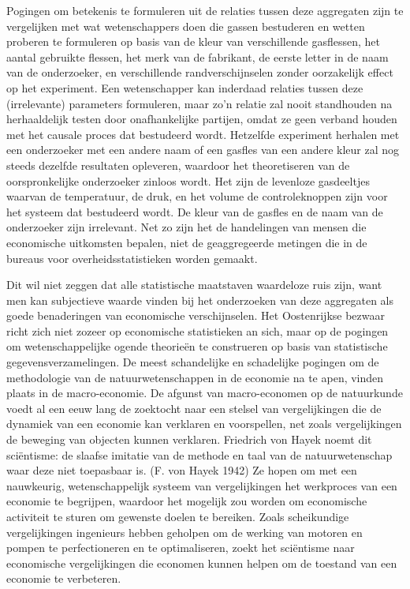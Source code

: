 \documentclass[
  a5paper,
  smalldemyvopaper,11pt,twoside,onecolumn,openright,extrafontsizes,
hidelinks]{memoir}
\begin{document}
Pogingen om betekenis te formuleren uit de relaties tussen deze
aggregaten zijn te vergelijken met wat wetenschappers doen die gassen
bestuderen en wetten proberen te formuleren op basis van de kleur van
verschillende gasflessen, het aantal gebruikte flessen, het merk van de
fabrikant, de eerste letter in de naam van de onderzoeker, en
verschillende randverschijnselen zonder oorzakelijk effect op het
experiment. Een wetenschapper kan inderdaad relaties tussen deze
(irrelevante) parameters formuleren, maar zo'n relatie zal nooit
standhouden na herhaaldelijk testen door onafhankelijke partijen, omdat
ze geen verband houden met het causale proces dat bestudeerd wordt.
Hetzelfde experiment herhalen met een onderzoeker met een andere naam of
een gasfles van een andere kleur zal nog steeds dezelfde resultaten
opleveren, waardoor het theoretiseren van de oorspronkelijke onderzoeker
zinloos wordt. Het zijn de levenloze gasdeeltjes waarvan de temperatuur,
de druk, en het volume de controleknoppen zijn voor het systeem dat
bestudeerd wordt. De kleur van de gasfles en de naam van de onderzoeker
zijn irrelevant. Net zo zijn het de handelingen van mensen die
economische uitkomsten bepalen, niet de geaggregeerde metingen die in de
bureaus voor overheidsstatistieken worden gemaakt.

Dit wil niet zeggen dat alle statistische maatstaven waardeloze ruis
zijn, want men kan subjectieve waarde vinden bij het onderzoeken van
deze aggregaten als goede benaderingen van economische verschijnselen.
Het Oostenrijkse bezwaar richt zich niet zozeer op economische
statistieken an sich, maar op de pogingen om wetenschappelijke ogende
theorieën te construeren op basis van statistische
gegevensverzamelingen. De meest schandelijke en schadelijke pogingen om
de methodologie van de natuurwetenschappen in de economie na te apen,
vinden plaats in de macro-economie. De afgunst van macro-economen op de
natuurkunde voedt al een eeuw lang de zoektocht naar een stelsel van
vergelijkingen die de dynamiek van een economie kan verklaren en
voorspellen, net zoals vergelijkingen de beweging van objecten kunnen
verklaren. Friedrich von Hayek noemt dit sciëntisme: de slaafse imitatie
van de methode en taal van de natuurwetenschap waar deze niet toepasbaar
is. (F. von Hayek 1942) Ze hopen om met een nauwkeurig, wetenschappelijk
systeem van vergelijkingen het werkproces van een economie te begrijpen,
waardoor het mogelijk zou worden om economische activiteit te sturen om
gewenste doelen te bereiken. Zoals scheikundige vergelijkingen
ingenieurs hebben geholpen om de werking van motoren en pompen te
perfectioneren en te optimaliseren, zoekt het sciëntisme naar
economische vergelijkingen die economen kunnen helpen om de toestand van
een economie te verbeteren.
\end{document}
